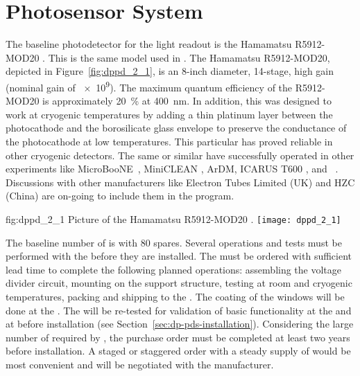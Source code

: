 \section{Photosensor System}
\label{sec:dp-pds-photosensors}

The baseline photodetector for the light readout is the Hamamatsu R5912-MOD20 . This is the same model used in . The Hamamatsu R5912-MOD20, depicted in  Figure~\ref{fig:dppd_2_1}, is an 8-inch diameter, 14-stage, high gain  (nominal gain of \num{e9}). The maximum quantum efficiency of the R5912-MOD20  is approximately \SI{20}{\%} at \SI{400}{\nano\m}. In addition, this  was designed to work at cryogenic temperatures by adding a thin platinum layer between the photocathode and the borosilicate glass envelope to preserve the conductance of the photocathode at low temperatures. This particular  has proved reliable in other cryogenic detectors. The same or similar  have successfully operated in other \lar experiments like MicroBooNE~\cite{microboone}, MiniCLEAN \cite{miniclean}, ArDM, ICARUS T600 \cite{icarus}, and ~\cite{protoDUNDP-tdr}. Discussions with other manufacturers like Electron Tubes Limited (UK) \cite{electrontubeslim} and HZC (China) \cite{hzc} are on-going to include them in the program.

\begin{dunefigure}{fig:dppd_2_1}
{Picture of the Hamamatsu R5912-MOD20  \cite{hamamatsu-5912}.}
\texttt{[image: dppd\_2\_1]}
\end{dunefigure}

The baseline number of  is \dpnumpmtch with \num{80} spares.  Several operations and tests must be performed with the  before they are installed. The  must be ordered with sufficient lead time to complete the following planned operations: assembling the voltage divider circuit, mounting on the support structure, testing at room and cryogenic temperatures, packing and shipping to the . The  coating of the  windows will be done at the . The  will be re-tested for validation of basic functionality at the  and at \surf before installation (see Section~\ref{sec:dp-pds-installation}). Considering the large number of  required by \dual {}, the purchase order must be completed at least two years before installation. A staged or staggered order with a steady supply of  would be most convenient and will be negotiated with the manufacturer.

